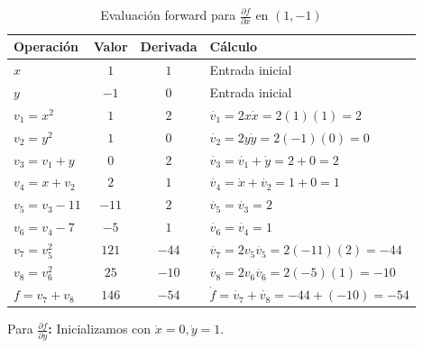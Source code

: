 \documentclass{article}
\begin{document}
\begin{table}[h]
\centering
\begin{tabular}{|l|c|c|l|}
\hline
\textbf{Operación} & \textbf{Valor} & \textbf{Derivada} & \textbf{Cálculo} \\
\hline
$x$ & $1$ & $1$ & Entrada inicial \\
$y$ & $-1$ & $0$ & Entrada inicial \\
\hline
$v_1 = x^2$ & $1$ & $2$ & $\dot{v_1} = 2x\dot{x} = 2(1)(1) = 2$ \\
$v_2 = y^2$ & $1$ & $0$ & $\dot{v_2} = 2y\dot{y} = 2(-1)(0) = 0$ \\
\hline
$v_3 = v_1 + y$ & $0$ & $2$ & $\dot{v_3} = \dot{v_1} + \dot{y} = 2 + 0 = 2$ \\
$v_4 = x + v_2$ & $2$ & $1$ & $\dot{v_4} = \dot{x} + \dot{v_2} = 1 + 0 = 1$ \\
\hline
$v_5 = v_3 - 11$ & $-11$ & $2$ & $\dot{v_5} = \dot{v_3} = 2$ \\
$v_6 = v_4 - 7$ & $-5$ & $1$ & $\dot{v_6} = \dot{v_4} = 1$ \\
\hline
$v_7 = v_5^2$ & $121$ & $-44$ & $\dot{v_7} = 2v_5\dot{v_5} = 2(-11)(2) = -44$ \\
$v_8 = v_6^2$ & $25$ & $-10$ & $\dot{v_8} = 2v_6\dot{v_6} = 2(-5)(1) = -10$ \\
\hline
$f = v_7 + v_8$ & $146$ & $-54$ & $\dot{f} = \dot{v_7} + \dot{v_8} = -44 + (-10) = -54$ \\
\hline
\end{tabular}
\caption{Evaluación forward para $\frac{\partial f}{\partial x}$ en $(1,-1)$}
\end{table}

Para\textbf{ $\frac{\partial f}{\partial y}$:}
Inicializamos con $\dot{x} = 0, \dot{y} = 1$.
\end{document}
